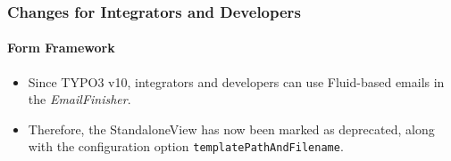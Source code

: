 %

\begin{frame}[fragile]
	\frametitle{Changes for Integrators and Developers}
	\framesubtitle{Form Framework}

	\begin{itemize}
		\item Since TYPO3 v10, integrators and developers can use Fluid-based emails
			in the \textit{EmailFinisher}.
		\item Therefore, the StandaloneView has now been marked as deprecated,
			along with the configuration option \texttt{templatePathAndFilename}.
	\end{itemize}

\end{frame}

